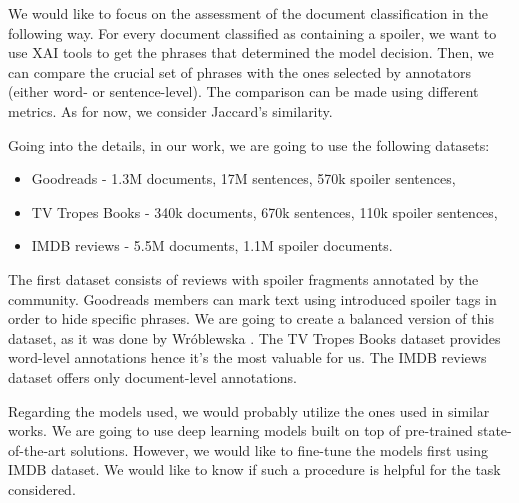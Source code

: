 \documentclass[11pt]{article}
\begin{document}
We would like to focus on the assessment of the document classification in the following way. For every document classified as containing a spoiler, we want to use XAI tools to get the phrases that determined the model decision. Then, we can compare the crucial set of phrases with the ones selected by annotators (either word- or sentence-level). The comparison can be made using different metrics. As for now, we consider Jaccard's similarity.

Going into the details, in our work, we are going to use the following datasets:
\begin{itemize}
    \item Goodreads - 1.3M documents, 17M sentences, 570k spoiler sentences,
    \item TV Tropes Books - 340k documents, 670k sentences, 110k spoiler sentences,
    \item IMDB reviews - 5.5M documents, 1.1M spoiler documents.
\end{itemize}

The first dataset consists of reviews with spoiler fragments annotated by the community. Goodreads members can mark text using introduced spoiler tags in order to hide specific phrases. We are going to create a balanced version of this dataset, as it was done by Wróblewska . The TV Tropes Books dataset provides word-level annotations hence it's the most valuable for us. The IMDB reviews dataset offers only document-level annotations.

Regarding the models used, we would probably utilize the ones used in similar works. We are going to use deep learning models built on top of pre-trained state-of-the-art solutions. However, we would like to fine-tune the models first using IMDB dataset. We would like to know if such a procedure is helpful for the task considered.


\end{document}

